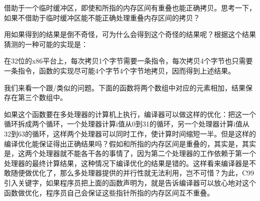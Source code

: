 借助于一个临时缓冲区，即使和所指的内存区间有重叠也能正确拷贝。思考一下，如果不借助于临时缓冲区能不能正确处理重叠内存区间的拷贝？



用如果得到的结果是倒不奇怪，可为什么会得到这个奇怪的结果呢？根据这个结果猜测的一种可能的实现是：




在32位的x86平台上，每次拷贝1个字节需要一条指令，每次拷贝4个字节也只需要一条指令，函数的实现尽可能4个字节4个字节地拷贝，因而得到上述结果。


\begin{BookNote}


我们来看一个跟/类似的问题。下面的函数将两个数组中对应的元素相加，结果保存在第三个数组中。




如果这个函数要在多处理器的计算机上执行，编译器可以做这样的优化：把这一个循环拆成两个循环，一个处理器计算i值从0到31的循环，另一个处理器计算i值从32到63的循环，这样两个处理器可以同时工作，使计算时间缩短一半。但是这样的编译优化能保证得出正确结果吗？假如和所指的内存区间是重叠的，其实是，其实是，这两个处理器就不能各干各的事情了，因为第二个处理器的工作依赖于第一个处理器的最终计算结果，这种情况下编译优化的结果是错的。这样看来编译器是不敢随便做优化了，那么多处理器提供的并行性就无法利用，岂不可惜？为此，C99引入关键字，如果程序员把上面的函数声明为，就是告诉编译器可以放心地对这个函数做优化，程序员自己会保证这些指针所指的内存区间互不重叠。




\end{BookNote}
